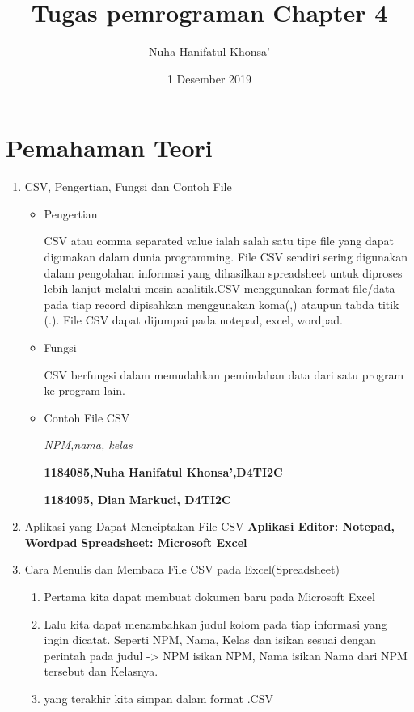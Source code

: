\documentclass[a4paper,12pt]{report}
\title{Tugas pemrograman Chapter 4}
\author{Nuha Hanifatul Khonsa'}
\date{1 Desember 2019}
\begin{document}
\maketitle

\section{Pemahaman Teori}
\begin{enumerate}
    \item CSV, Pengertian, Fungsi dan Contoh File
    \begin{itemize}
        \item Pengertian
        \par CSV atau comma separated value ialah salah satu tipe file yang dapat digunakan dalam dunia programming. File CSV sendiri sering digunakan dalam pengolahan informasi yang dihasilkan spreadsheet untuk diproses lebih lanjut melalui mesin analitik.CSV menggunakan format file/data pada tiap record dipisahkan menggunakan koma(,) ataupun tabda titik (.). File CSV dapat dijumpai pada notepad, excel, wordpad.
        \item Fungsi
        \par CSV berfungsi dalam memudahkan pemindahan data dari satu program ke program lain.
        \item Contoh File CSV
        \par\textit{NPM,nama, kelas}
        \par\textbf{1184085,Nuha Hanifatul Khonsa',D4TI2C}
        \par\textbf{1184095, Dian Markuci, D4TI2C}
    \end{itemize}
    
    \item Aplikasi yang Dapat Menciptakan File CSV
    \textbf{Aplikasi Editor: Notepad, Wordpad}
    \textbf{Spreadsheet: Microsoft Excel}
    
    \item Cara Menulis dan Membaca File CSV pada Excel(Spreadsheet)
    \begin{enumerate}
        \item Pertama kita dapat membuat dokumen baru pada Microsoft Excel
        \item Lalu kita dapat menambahkan judul kolom pada tiap informasi yang ingin dicatat. Seperti NPM, Nama, Kelas dan isikan sesuai dengan perintah pada judul -> NPM isikan NPM, Nama isikan Nama dari NPM tersebut dan Kelasnya.
        \item yang terakhir kita simpan dalam format .CSV
    \end{enumerate}
    

\end{enumerate}
\end{document}
